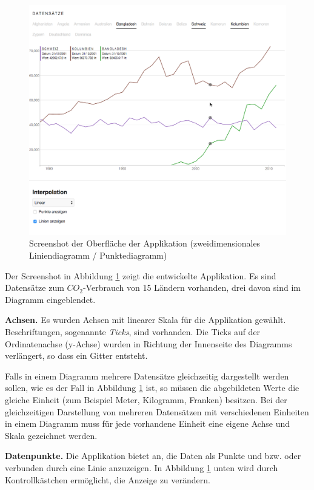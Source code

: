 \begin{figure}[!htbp]
	\centering
	\includegraphics[width=\linewidth]{images/2dline}
	\caption{Screenshot der Oberfläche der Applikation (zweidimensionales Liniendiagramm / Punktediagramm)}
	\label{fig:screenshot}
\end{figure}

Der Screenshot in Abbildung \ref{fig:screenshot} zeigt die entwickelte Applikation. Es sind Datensätze \cite{worldbank} zum $CO_2$-Verbrauch von 15 Ländern vorhanden, drei davon sind im Diagramm eingeblendet.

\textbf{Achsen.} Es wurden Achsen mit linearer Skala für die Applikation gewählt. Beschriftungen, sogenannte \textit{Ticks}, sind vorhanden. Die Ticks auf der Ordinatenachse (y-Achse) wurden in Richtung der Innenseite des Diagramms verlängert, so dass ein Gitter entsteht.

Falls in einem Diagramm mehrere Datensätze gleichzeitig dargestellt werden sollen, wie es der Fall in Abbildung \ref{fig:screenshot} ist, so müssen die abgebildeten Werte die gleiche Einheit (zum Beispiel Meter, Kilogramm, Franken) besitzen. Bei der gleichzeitigen Darstellung von mehreren Datensätzen mit verschiedenen Einheiten in einem Diagramm muss für jede vorhandene Einheit eine eigene Achse und Skala gezeichnet werden.

\textbf{Datenpunkte.} Die Applikation bietet an, die Daten als Punkte und bzw. oder verbunden durch eine Linie anzuzeigen. In Abbildung \ref{fig:screenshot} unten wird durch Kontrollkästchen ermöglicht, die Anzeige zu verändern.

